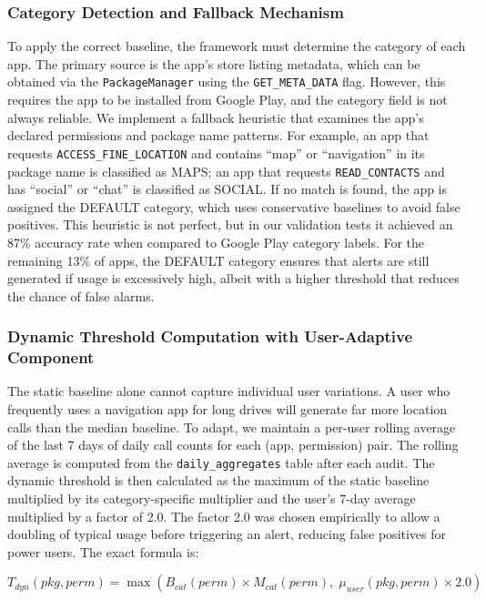 \subsubsection{Category Detection and Fallback Mechanism}

To apply the correct baseline, the framework must determine the category of each app. The primary source is the app's store listing metadata, which can be obtained via the \texttt{PackageManager} using the \texttt{GET\_META\_DATA} flag. However, this requires the app to be installed from Google Play, and the category field is not always reliable. We implement a fallback heuristic that examines the app's declared permissions and package name patterns. For example, an app that requests \texttt{ACCESS\_FINE\_LOCATION} and contains ``map'' or ``navigation'' in its package name is classified as MAPS; an app that requests \texttt{READ\_CONTACTS} and has ``social'' or ``chat'' is classified as SOCIAL. If no match is found, the app is assigned the DEFAULT category, which uses conservative baselines to avoid false positives. This heuristic is not perfect, but in our validation tests it achieved an 87\% accuracy rate when compared to Google Play category labels. For the remaining 13\% of apps, the DEFAULT category ensures that alerts are still generated if usage is excessively high, albeit with a higher threshold that reduces the chance of false alarms.

\subsubsection{Dynamic Threshold Computation with User-Adaptive Component}

The static baseline alone cannot capture individual user variations. A user who frequently uses a navigation app for long drives will generate far more location calls than the median baseline. To adapt, we maintain a per-user rolling average of the last 7 days of daily call counts for each (app, permission) pair. The rolling average is computed from the \texttt{daily\_aggregates} table after each audit. The dynamic threshold is then calculated as the maximum of the static baseline multiplied by its category-specific multiplier and the user's 7-day average multiplied by a factor of 2.0. The factor 2.0 was chosen empirically to allow a doubling of typical usage before triggering an alert, reducing false positives for power users. The exact formula is:

\[
T_{dyn}(pkg, perm) = \max\left( B_{cat}(perm) \times M_{cat}(perm), \; \mu_{user}(pkg, perm) \times 2.0 \right)
\]

